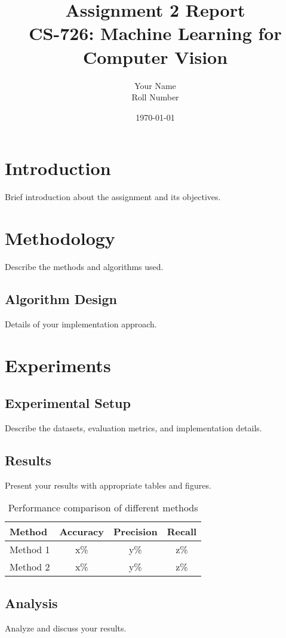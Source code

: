 \documentclass[11pt]{article}
\title{Assignment 2 Report\\
    CS-726: Machine Learning for Computer Vision}
\author{Your Name\\
     Roll Number}
\date{\today}
\begin{document}
\maketitle

\section{Introduction}
Brief introduction about the assignment and its objectives.

\section{Methodology}
Describe the methods and algorithms used.

\subsection{Algorithm Design}
Details of your implementation approach.

\section{Experiments}
\subsection{Experimental Setup}
Describe the datasets, evaluation metrics, and implementation details.

\subsection{Results}
Present your results with appropriate tables and figures.

\begin{table}[h]
\centering
\begin{tabular}{lccc}
\toprule
Method & Accuracy & Precision & Recall \\
\midrule
Method 1 & x\% & y\% & z\% \\
Method 2 & x\% & y\% & z\% \\
\bottomrule
\end{tabular}
\caption{Performance comparison of different methods}
\label{tab:results}
\end{table}

\subsection{Analysis}
Analyze and discuss your results.
\end{document}

